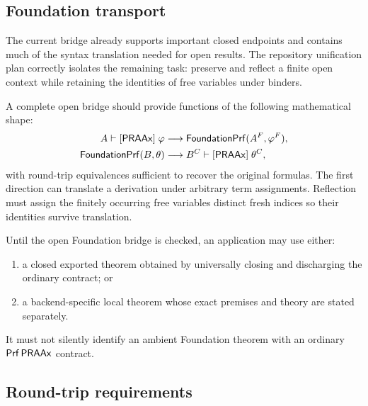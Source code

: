 \subsection{Foundation transport}

The current bridge already supports important closed endpoints and contains much of the syntax translation needed for open results.  The repository unification plan correctly isolates the remaining task: preserve and reflect a finite open context while retaining the identities of free variables under binders.

A complete open bridge should provide functions of the following mathematical shape:
\begin{align*}
 A\mathrel{\vdash[\mathsf{PRAAx}]}\varphi
   &\longrightarrow
   \mathsf{FoundationPrf}(A^F,\varphi^F),\\
 \mathsf{FoundationPrf}(B,\theta)
   &\longrightarrow
   B^C\mathrel{\vdash[\mathsf{PRAAx}]}\theta^C,
\end{align*}
with round-trip equivalences sufficient to recover the original formulas.  The first direction can translate a derivation under arbitrary term assignments.  Reflection must assign the finitely occurring free variables distinct fresh indices so their identities survive translation.

\begin{principle}
Until the open Foundation bridge is checked, an application may use either:
\begin{enumerate}
  \item a closed exported theorem obtained by universally closing and discharging the ordinary contract; or
  \item a backend-specific local theorem whose exact premises and theory are stated separately.
\end{enumerate}
It must not silently identify an ambient Foundation theorem with an ordinary \(\mathsf{Prf}\,\mathsf{PRAAx}\) contract.
\end{principle}

\subsection{Round-trip requirements}

